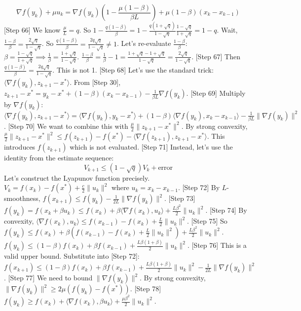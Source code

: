 \documentclass{article}
\begin{document}
$$ \nabla f(y_k) + \mu u_k = \nabla f(y_k)(1 - \frac{\mu(1-\beta)}{\beta L}) + \mu(1-\beta)(x_k - x_{k-1}) $$
[Step 66] We know $\frac{\mu}{L} = q$. So $1 - \frac{q(1-\beta)}{\beta} = 1 - \frac{q(1+\sqrt{q})}{1-\sqrt{q}} \frac{1-\sqrt{q}}{1+\sqrt{q}} = 1 - q$.
Wait, $\frac{1-\beta}{\beta} = \frac{2\sqrt{q}}{1-\sqrt{q}}$.
So $\frac{q(1-\beta)}{\beta} = \frac{2q\sqrt{q}}{1-\sqrt{q}} \neq 1$.
Let's re-evaluate $\frac{1-\beta}{\beta}$:
$\beta = \frac{1-\sqrt{q}}{1+\sqrt{q}} \implies \frac{1}{\beta} = \frac{1+\sqrt{q}}{1-\sqrt{q}}$.
$\frac{1-\beta}{\beta} = \frac{1}{\beta} - 1 = \frac{1+\sqrt{q} - 1 + \sqrt{q}}{1-\sqrt{q}} = \frac{2\sqrt{q}}{1-\sqrt{q}}$.
[Step 67] Then $\frac{q(1-\beta)}{\beta} = \frac{2q\sqrt{q}}{1-\sqrt{q}}$. This is not 1.
[Step 68] Let's use the standard trick: $\langle \nabla f(y_k), z_{k+1} - x^* \rangle$.
From [Step 30], $z_{k+1} - x^* = y_k - x^* + (1-\beta)(x_k - x_{k-1}) - \frac{1}{\beta L}\nabla f(y_k)$.
[Step 69] Multiply by $\nabla f(y_k)$:
$\langle \nabla f(y_k), z_{k+1} - x^* \rangle = \langle \nabla f(y_k), y_k - x^* \rangle + (1-\beta)\langle \nabla f(y_k), x_k - x_{k-1} \rangle - \frac{1}{\beta L}\|\nabla f(y_k)\|^2$.
[Step 70] We want to combine this with $\frac{\mu}{2}\|z_{k+1} - x^*\|^2$.
By strong convexity, $\frac{\mu}{2}\|z_{k+1} - x^*\|^2 \le f(z_{k+1}) - f(x^*) - \langle \nabla f(z_{k+1}), z_{k+1} - x^* \rangle$. This introduces $f(z_{k+1})$ which is not evaluated.
[Step 71] Instead, let's use the identity from the estimate sequence:
$$ V_{k+1} \le (1-\sqrt{q}) V_k + \text{error} $$
Let's construct the Lyapunov function precisely.
$V_k = f(x_k) - f(x^*) + \frac{c}{2}\|u_k\|^2$ where $u_k = x_k - x_{k-1}$.
[Step 72] By $L$-smoothness, $f(x_{k+1}) \le f(y_k) - \frac{1}{2L}\|\nabla f(y_k)\|^2$.
[Step 73] $f(y_k) = f(x_k + \beta u_k) \le f(x_k) + \beta \langle \nabla f(x_k), u_k \rangle + \frac{L\beta^2}{2}\|u_k\|^2$.
[Step 74] By convexity, $\langle \nabla f(x_k), u_k \rangle \le f(x_{k-1}) - f(x_k) + \frac{L}{2}\|u_k\|^2$.
[Step 75] So $f(y_k) \le f(x_k) + \beta(f(x_{k-1}) - f(x_k) + \frac{L}{2}\|u_k\|^2) + \frac{L\beta^2}{2}\|u_k\|^2$.
$f(y_k) \le (1-\beta)f(x_k) + \beta f(x_{k-1}) + \frac{L\beta(1+\beta)}{2}\|u_k\|^2$.
[Step 76] This is a valid upper bound. Substitute into [Step 72]:
$f(x_{k+1}) \le (1-\beta)f(x_k) + \beta f(x_{k-1}) + \frac{L\beta(1+\beta)}{2}\|u_k\|^2 - \frac{1}{2L}\|\nabla f(y_k)\|^2$.
[Step 77] We need to bound $\|\nabla f(y_k)\|^2$.
By strong convexity, $\|\nabla f(y_k)\|^2 \ge 2\mu(f(y_k) - f(x^*))$.
[Step 78] $f(y_k) \ge f(x_k) + \langle \nabla f(x_k), \beta u_k \rangle + \frac{\mu\beta^2}{2}\|u_k\|^2$.
\end{document}
